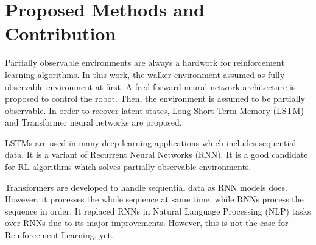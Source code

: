 \section{Proposed Methods and Contribution}
\label{sec:proposedmethods}

Partially observable environments are always a hardwork for reinforcement learning algorithms. In this work, the walker environment assumed as fully observable environment at first. A feed-forward neural network architecture is proposed to control the robot. Then, the environment is assumed to be partially observable. In order to recover latent states, Long Short Term Memory (LSTM) and Transformer neural networks are proposed. 

LSTMs are used in many deep learning applications which includes sequential data. It is a variant of Recurrent Neural Networks (RNN). It is a good candidate for RL algorithms which solves partially observable environments.

Transformers are developed to handle sequential data as RNN models does. However, it processes the whole sequence at same time, while RNNs process the sequence in order. It replaced RNNs in Natural Language Processing (NLP) tasks over RNNs due to its major improvements. However, this is not the case for Reinforcement Learning, yet.